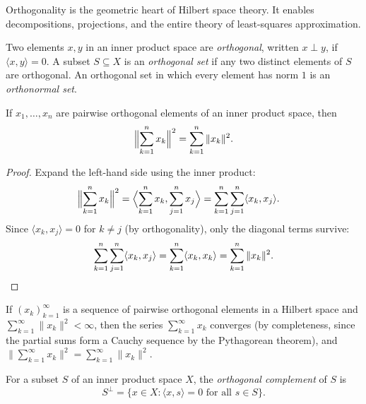 \documentclass[11pt,a4paper]{article}
\begin{document}
Orthogonality is the geometric heart of Hilbert space theory. It enables
decompositions, projections, and the entire theory of least-squares
approximation.

\begin{definition}[Orthogonality]
\label{def:orthogonality}
Two elements $x, y$ in an inner product space are \emph{orthogonal}, written
$x \perp y$, if $\langle x, y \rangle = 0$. A subset $S \subseteq X$ is an
\emph{orthogonal set} if any two distinct elements of $S$ are orthogonal.
An orthogonal set in which every element has norm $1$ is an
\emph{orthonormal set}.
\end{definition}

\begin{theorem}
\label{thm:pythagorean}
If $x_1, \ldots, x_n$ are pairwise orthogonal elements of an inner product
space, then
\[
\Bigl\|\sum_{k=1}^n x_k\Bigr\|^2 = \sum_{k=1}^n \|x_k\|^2.
\]
\end{theorem}

\begin{proof}
Expand the left-hand side using the inner product:
\begin{align*}
\Bigl\|\sum_{k=1}^n x_k\Bigr\|^2
&= \Bigl\langle \sum_{k=1}^n x_k, \sum_{j=1}^n x_j \Bigr\rangle
= \sum_{k=1}^n \sum_{j=1}^n \langle x_k, x_j \rangle.
\end{align*}
Since $\langle x_k, x_j \rangle = 0$ for $k \ne j$ (by orthogonality),
only the diagonal terms survive:
\[
\sum_{k=1}^n \sum_{j=1}^n \langle x_k, x_j \rangle
= \sum_{k=1}^n \langle x_k, x_k \rangle
= \sum_{k=1}^n \|x_k\|^2. \qedhere
\]
\end{proof}

\begin{remark}
\label{rem:infinite_pythag}
If $(x_k)_{k=1}^\infty$ is a sequence of pairwise orthogonal elements in a
Hilbert space and $\sum_{k=1}^\infty \|x_k\|^2 < \infty$, then the series
$\sum_{k=1}^\infty x_k$ converges (by completeness, since the partial sums
form a Cauchy sequence by the Pythagorean theorem), and
$\bigl\|\sum_{k=1}^\infty x_k\bigr\|^2 = \sum_{k=1}^\infty \|x_k\|^2$.
\end{remark}

\begin{definition}
\label{def:orth_complement}
For a subset $S$ of an inner product space $X$, the \emph{orthogonal
complement} of $S$ is
\[
S^\perp = \{x \in X : \langle x, s \rangle = 0 \text{ for all } s \in S\}.
\]
\end{definition}
\end{document}
